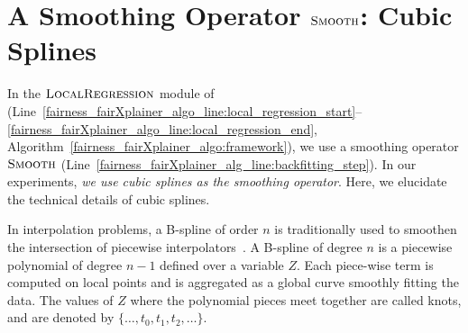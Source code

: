 \section{A Smoothing Operator $\textsc{Smooth}$: Cubic Splines}
\label{fairness_fairXplainer_sec:smoothing} 
In the $\textsc{LocalRegression}$ module of {\fairXplainer} (Line~\ref{fairness_fairXplainer_algo_line:local_regression_start}--\ref{fairness_fairXplainer_algo_line:local_regression_end}, Algorithm~\ref{fairness_fairXplainer_algo:framework}), we use a smoothing operator $\textsc{Smooth}$ (Line~\ref{fairness_fairXplainer_alg_line:backfitting_step}). In our experiments, \textit{we use cubic splines as the smoothing operator}. Here, we elucidate the technical details of cubic splines.

In interpolation problems, a B-spline of order $ n $ is traditionally used to smoothen the intersection of piecewise interpolators~\cite{schumaker2007spline}. A B-spline of degree $n$ is a piecewise polynomial of degree $ n - 1 $ defined over a variable $ Z $. Each piece-wise term is computed on local points and is aggregated as a global curve smoothly fitting the data. The values of $ Z $ where the polynomial pieces meet together are called knots, and are denoted by $\{ \dots, t_0, t_1, t_2, \dots\} $. 

